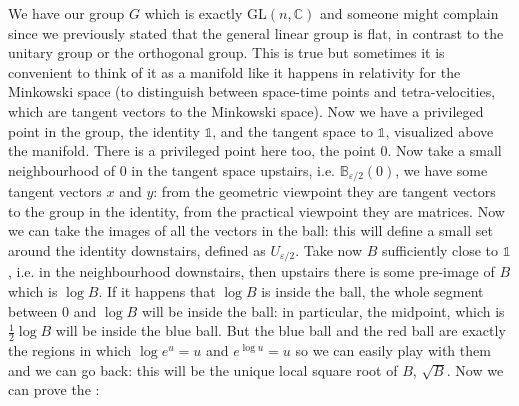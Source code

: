 \documentclass[../main.tex]{subfiles}
\begin{document}
We have our group $G$ which is exactly GL$(n,\mathbb{C})$ and someone might complain since we previously stated that the general linear group is flat, in contrast to the unitary group or the orthogonal group. This is true but sometimes it is convenient to think of it as a manifold like it happens in relativity for the Minkowski space (to distinguish between space-time points and tetra-velocities, which are tangent vectors to the Minkowski space). Now we have a privileged point in the group, the identity $\mathbb{1}$, and the tangent space to $\mathbb{1}$, visualized above the manifold. There is a privileged point here too, the point 0. Now take a small neighbourhood of 0 in the tangent space upstairs, i.e. $\mathbb{B}_{\varepsilon/2}(0)$, we have some tangent vectors $x$ and $y$: from the geometric viewpoint they are tangent vectors to the group in the identity, from the practical viewpoint they are matrices. Now we can take the images of all the vectors in the ball: this will define a small set around the identity downstairs, defined as $U_{\varepsilon/2}$. Take now $B$ sufficiently close to $\mathbb{1}$, i.e. in the neighbourhood downstairs, then upstairs there is some pre-image of $B$ which is $\log B$. If it happens that $\log B$ is inside the ball, the whole segment between 0 and $\log B$ will be inside the ball: in particular, the midpoint, which is $\frac{1}{2}\log B$ will be inside the blue ball. But the blue ball and the red ball are exactly the regions in which $\log e^u=u$ and $e^{\log u}=u$ so we can easily play with them and we can go back: this will be the unique local square root of $B$, $\sqrt{B}$. 
Now we can prove the :
\end{document}
